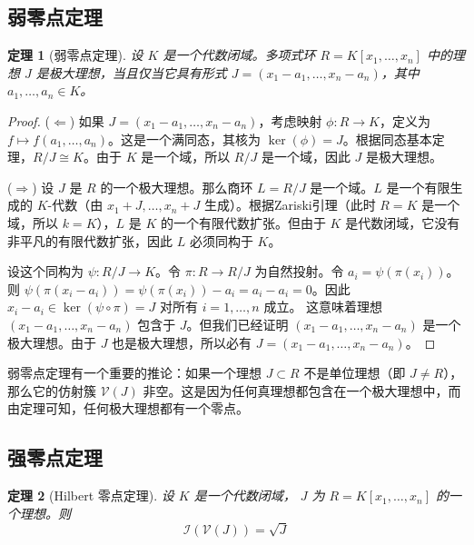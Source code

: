 \documentclass[UTF8]{ctexart}
\newtheorem{theorem}{定理}[section]
\newcommand{\V}{\mathcal{V}}
\newcommand{\I}{\mathcal{I}}
\begin{document}
\subsection{弱零点定理}

\begin{theorem}[弱零点定理]
设 $K$ 是一个代数闭域。多项式环 $R = K[x_1, \dots, x_n]$ 中的理想 $J$ 是极大理想，当且仅当它具有形式 $J = (x_1 - a_1, \dots, x_n - a_n)$，其中 $a_1, \dots, a_n \in K$。
\end{theorem}

\begin{proof}
($\Leftarrow$) 如果 $J = (x_1 - a_1, \dots, x_n - a_n)$，考虑映射 $\phi: R \to K$，定义为 $f \mapsto f(a_1, \dots, a_n)$。这是一个满同态，其核为 $\ker(\phi) = J$。根据同态基本定理，$R/J \cong K$。由于 $K$ 是一个域，所以 $R/J$ 是一个域，因此 $J$ 是极大理想。

($\Rightarrow$) 设 $J$ 是 $R$ 的一个极大理想。那么商环 $L = R/J$ 是一个域。$L$ 是一个有限生成的 $K$-代数（由 $x_1+J, \dots, x_n+J$ 生成）。根据Zariski引理（此时 $R=K$ 是一个域，所以 $k=K$），$L$ 是 $K$ 的一个有限代数扩张。但由于 $K$ 是代数闭域，它没有非平凡的有限代数扩张，因此 $L$ 必须同构于 $K$。

设这个同构为 $\psi: R/J \to K$。令 $\pi: R \to R/J$ 为自然投射。令 $a_i = \psi(\pi(x_i))$。则 $\psi(\pi(x_i - a_i)) = \psi(\pi(x_i)) - a_i = a_i - a_i = 0$。因此 $x_i - a_i \in \ker(\psi \circ \pi) = J$ 对所有 $i=1, \dots, n$ 成立。
这意味着理想 $(x_1 - a_1, \dots, x_n - a_n)$ 包含于 $J$。但我们已经证明 $(x_1 - a_1, \dots, x_n - a_n)$ 是一个极大理想。由于 $J$ 也是极大理想，所以必有 $J = (x_1 - a_1, \dots, x_n - a_n)$。
\end{proof}

弱零点定理有一个重要的推论：如果一个理想 $J \subset R$ 不是单位理想（即 $J \neq R$），那么它的仿射簇 $\V(J)$ 非空。这是因为任何真理想都包含在一个极大理想中，而由定理可知，任何极大理想都有一个零点。

\subsection{强零点定理}

\begin{theorem}[Hilbert 零点定理]
设 $K$ 是一个代数闭域， $J$ 为 $R=K[x_1, \dots, x_n]$ 的一个理想。则
$$ \I(\V(J)) = \sqrt{J} $$
\end{theorem}
\end{document}
